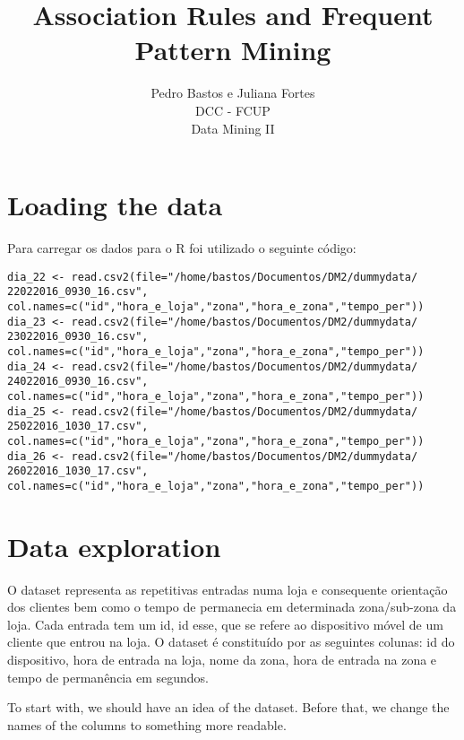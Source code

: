 \documentclass[a4paper]{article}
\begin{document}


\title{Association Rules and Frequent Pattern Mining}
\author{Pedro Bastos e Juliana Fortes \\ DCC - FCUP \\ Data Mining II}

\maketitle



\section{Loading the data}

Para carregar os dados para o R foi utilizado o seguinte código:

\begin{lstlisting}
dia_22 <- read.csv2(file="/home/bastos/Documentos/DM2/dummydata/
22022016_0930_16.csv", 
col.names=c("id","hora_e_loja","zona","hora_e_zona","tempo_per"))
dia_23 <- read.csv2(file="/home/bastos/Documentos/DM2/dummydata/
23022016_0930_16.csv", 
col.names=c("id","hora_e_loja","zona","hora_e_zona","tempo_per"))
dia_24 <- read.csv2(file="/home/bastos/Documentos/DM2/dummydata/
24022016_0930_16.csv", 
col.names=c("id","hora_e_loja","zona","hora_e_zona","tempo_per"))
dia_25 <- read.csv2(file="/home/bastos/Documentos/DM2/dummydata/
25022016_1030_17.csv", 
col.names=c("id","hora_e_loja","zona","hora_e_zona","tempo_per"))
dia_26 <- read.csv2(file="/home/bastos/Documentos/DM2/dummydata/
26022016_1030_17.csv", 
col.names=c("id","hora_e_loja","zona","hora_e_zona","tempo_per"))
\end{lstlisting}

\section{Data exploration}

O dataset representa as repetitivas entradas numa loja e consequente orientação dos clientes bem como o tempo de permanecia em determinada zona/sub-zona da loja. Cada entrada tem um id, id esse, que se refere ao dispositivo móvel de um cliente que entrou na loja. 
O dataset é constituído por as seguintes colunas: id do dispositivo, hora de entrada na loja, nome da zona, hora de entrada na zona e tempo de permanência em segundos.
 
To start with, we should have an idea of the dataset. Before that, we change the names of the columns to something more readable.
\end{document}
